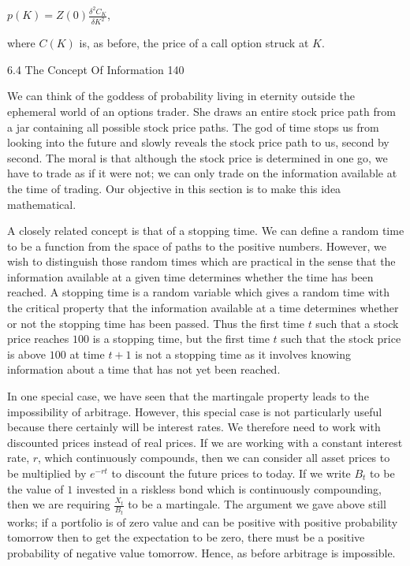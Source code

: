 $p(K) = Z(0) \frac{\delta^2 C_K}{\delta K^2}$,

where $C(K)$ is, as before, the price of a call option struck at $K$.

6.4 The Concept Of Information 140

We can think of the goddess of probability living in eternity outside the ephemeral world of an options trader. She draws an entire stock price path from a jar containing all possible stock price paths. The god of time stops us from looking into the future and slowly reveals the stock price path to us, second by second. The moral is that although the stock price is determined in one go, we have to trade as if it were not; we can only trade on the information available at the time of trading. Our objective in this section is to make this idea mathematical.

A closely related concept is that of a stopping time. We can define a random time to be a function from the space of paths to the positive numbers. However, we wish to distinguish those random times which are practical in the sense that the information available at a given time determines whether the time has been reached. A stopping time is a random variable which gives a random time with the critical property that the information available at a time determines whether or not the stopping time has been passed. Thus the first time $t$ such that a stock price reaches $100$ is a stopping time, but the first time $t$ such that the stock price is above $100$ at time $t+1$ is not a stopping time as it involves knowing information about a time that has not yet been reached.

In one special case, we have seen that the martingale property leads to the impossibility of arbitrage. However, this special case is not particularly useful because there certainly will be interest rates. We therefore need to work with discounted prices instead of real prices. If we are working with a constant interest rate, $r$, which continuously compounds, then we can consider all asset prices to be multiplied by $e^{-rt}$ to discount the future prices to today. If we write $B_t$ to be the value of $1$ invested in a riskless bond which is continuously compounding, then we are requiring $\frac{X_t}{B_t}$ to be a martingale. The argument we gave above still works; if a portfolio is of zero value and can be positive with positive probability tomorrow then to get the expectation to be zero, there must be a positive probability of negative value tomorrow. Hence, as before arbitrage is impossible.

